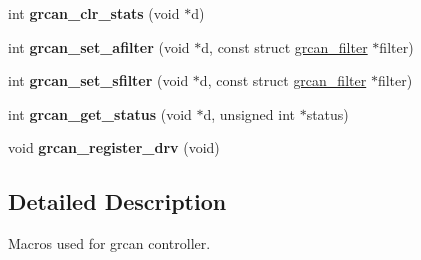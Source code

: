 \begin{DoxyCompactItemize}
\item 
\mbox{\label{group__can_gac0b45417982cdcf6afe9f9350c4e9c94}} 
int {\bfseries grcan\+\_\+clr\+\_\+stats} (void $\ast$d)
\item 
\mbox{\label{group__can_ga1641008565fe9f3db703558fe81b62d8}} 
int {\bfseries grcan\+\_\+set\+\_\+afilter} (void $\ast$d, const struct \mbox{\hyperlink{structgrcan__filter}{grcan\+\_\+filter}} $\ast$filter)
\item 
\mbox{\label{group__can_ga6b766049013aae68162c510d625ec2cf}} 
int {\bfseries grcan\+\_\+set\+\_\+sfilter} (void $\ast$d, const struct \mbox{\hyperlink{structgrcan__filter}{grcan\+\_\+filter}} $\ast$filter)
\item 
\mbox{\label{group__can_ga10db3f278c04857681b9d265c0c558a7}} 
int {\bfseries grcan\+\_\+get\+\_\+status} (void $\ast$d, unsigned int $\ast$status)
\item 
\mbox{\label{group__can_gaad9a49cfb35ac14d61cf6b3f057dc851}} 
void {\bfseries grcan\+\_\+register\+\_\+drv} (void)
\end{DoxyCompactItemize}


\subsection{Detailed Description}
Macros used for grcan controller. 


